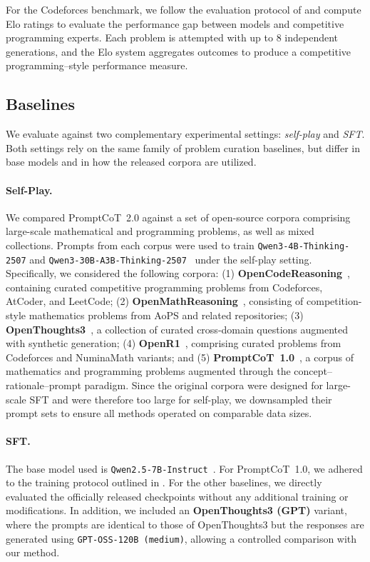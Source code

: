   For the Codeforces benchmark, we follow the evaluation protocol of \citet{luo2025deepcoder} and compute Elo ratings to evaluate the performance gap between models and competitive programming experts.
  Each problem is attempted with up to 8 independent generations, and the Elo system aggregates outcomes to produce a competitive programming–style performance measure.  
  
  \subsection{Baselines}
  
  We evaluate against two complementary experimental settings: \emph{self-play} and \emph{SFT}. 
  Both settings rely on the same family of problem curation baselines, but differ in base models and in how the released corpora are utilized.
  
  \paragraph{Self-Play.}
  We compared PromptCoT~2.0 against a set of open-source corpora comprising large-scale mathematical and programming problems, as well as mixed collections. Prompts from each corpus were used to train \texttt{Qwen3-4B-Thinking-2507} and \texttt{Qwen3-30B-A3B-Thinking-2507}~\citep{yang2025qwen3} under the self-play setting. Specifically, we considered the following corpora:
  (1) \textbf{OpenCodeReasoning}~\citep{ahmad2025opencodereasoning}, containing curated competitive programming problems from Codeforces, AtCoder, and LeetCode;
  (2) \textbf{OpenMathReasoning}~\citep{moshkov2025aimo}, consisting of competition-style mathematics problems from AoPS and related repositories;
  (3) \textbf{OpenThoughts3}~\citep{guha2025openthoughts}, a collection of curated cross-domain questions augmented with synthetic generation;
  (4) \textbf{OpenR1}~\citep{openr1}, comprising curated problems from Codeforces and NuminaMath variants; and
  (5) \textbf{PromptCoT~1.0}~\citep{zhao2025promptcot,zhao2025scaling}, a corpus of mathematics and programming problems augmented through the concept–rationale–prompt paradigm. Since the original corpora were designed for large-scale SFT and were therefore too large for self-play, we downsampled their prompt sets to ensure all methods operated on comparable data sizes.
  
  
  
  
  
  
  \paragraph{SFT.} The base model used is \texttt{Qwen2.5-7B-Instruct}~\citep{yang2024qwen2_5}. For PromptCoT~1.0, we adhered to the training protocol outlined in \citet{zhao2025scaling}. For the other baselines, we directly evaluated the officially released checkpoints without any additional training or modifications. In addition, we included an \textbf{OpenThoughts3 (GPT)} variant, where the prompts are identical to those of OpenThoughts3 but the responses are generated using \texttt{GPT-OSS-120B (medium)}, allowing a controlled comparison with our method.
  
